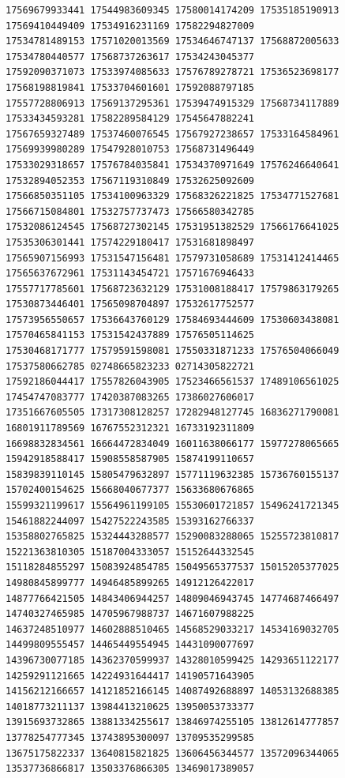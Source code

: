\documentclass[10pt]{article}
\begin{document}
\begin{verbatim}
17569679933441 17544983609345 17580014174209 17535185190913 17569410449409 17534916231169 17582294827009
17534781489153 17571020013569 17534646747137 17568872005633 17534780440577 17568737263617 17534243045377
17592090371073 17533974085633 17576789278721 17536523698177 17568198819841 17533704601601 17592088797185
17557728806913 17569137295361 17539474915329 17568734117889 17533434593281 17582289584129 17545647882241
17567659327489 17537460076545 17567927238657 17533164584961 17569939980289 17547928010753 17568731496449
17533029318657 17576784035841 17534370971649 17576246640641 17532894052353 17567119310849 17532625092609
17566850351105 17534100963329 17568326221825 17534771527681 17566715084801 17532757737473 17566580342785
17532086124545 17568727302145 17531951382529 17566176641025 17535306301441 17574229180417 17531681898497
17565907156993 17531547156481 17579731058689 17531412414465 17565637672961 17531143454721 17571676946433
17557717785601 17568723632129 17531008188417 17579863179265 17530873446401 17565098704897 17532617752577
17573956550657 17536643760129 17584693444609 17530603438081 17570465841153 17531542437889 17576505114625
17530468171777 17579591598081 17550331871233 17576504066049 17537580662785 02748665823233 02714305822721
17592186044417 17557826043905 17523466561537 17489106561025 17454747083777 17420387083265 17386027606017
17351667605505 17317308128257 17282948127745 16836271790081 16801911789569 16767552312321 16733192311809
16698832834561 16664472834049 16011638066177 15977278065665 15942918588417 15908558587905 15874199110657
15839839110145 15805479632897 15771119632385 15736760155137 15702400154625 15668040677377 15633680676865
15599321199617 15564961199105 15530601721857 15496241721345 15461882244097 15427522243585 15393162766337
15358802765825 15324443288577 15290083288065 15255723810817 15221363810305 15187004333057 15152644332545
15118284855297 15083924854785 15049565377537 15015205377025 14980845899777 14946485899265 14912126422017
14877766421505 14843406944257 14809046943745 14774687466497 14740327465985 14705967988737 14671607988225
14637248510977 14602888510465 14568529033217 14534169032705 14499809555457 14465449554945 14431090077697
14396730077185 14362370599937 14328010599425 14293651122177 14259291121665 14224931644417 14190571643905
14156212166657 14121852166145 14087492688897 14053132688385 14018773211137 13984413210625 13950053733377
13915693732865 13881334255617 13846974255105 13812614777857 13778254777345 13743895300097 13709535299585
13675175822337 13640815821825 13606456344577 13572096344065 13537736866817 13503376866305 13469017389057

\end{verbatim}
\end{document}
